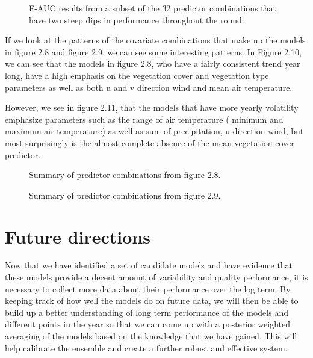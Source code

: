 \begin{figure} [!ht]
\centerline{}
\caption{F-AUC results from a subset of the 32 predictor combinations that have two steep dips in performance throughout the round. }
\label{fig6}
\end{figure}

\noindent  If we look at the patterns of the covariate combinations that make up the models in figure 2.8 and figure 2.9, we can see some interesting patterns. In Figure 2.10, we can see that the models in figure 2.8, who have a fairly consistent trend year long, have a high emphasis on the vegetation cover and vegetation type parameters as well as both u and v direction wind and mean air temperature. \newline

\noindent However, we see in figure 2.11, that the models that have more yearly volatility emphasize parameters such as the range of air temperature ( minimum and maximum air temperature) as well as sum of precipitation, u-direction wind, but most surprisingly is the almost complete absence of the mean vegetation cover predictor. \newline

\begin{figure} [t]
\centerline{}
\caption{Summary of predictor combinations from figure 2.8. }
\label{fig6}
\end{figure}

\begin{figure} [t]
\centerline{}
\caption{Summary of predictor combinations from figure 2.9. }
\label{fig6}
\end{figure}

  
\section{Future directions}

Now that we have identified a set of candidate models and have evidence that these models provide a decent amount of variability and quality performance, it is necessary to collect more data about their performance over the log term. By keeping track of how well the models do on future data, we will then be able to build up a better understanding of long term performance of the models and different points in the year so that we can come up with a posterior weighted averaging of the models based on the knowledge that we have gained. This will help calibrate the ensemble and create a further robust and effective system. \newline

